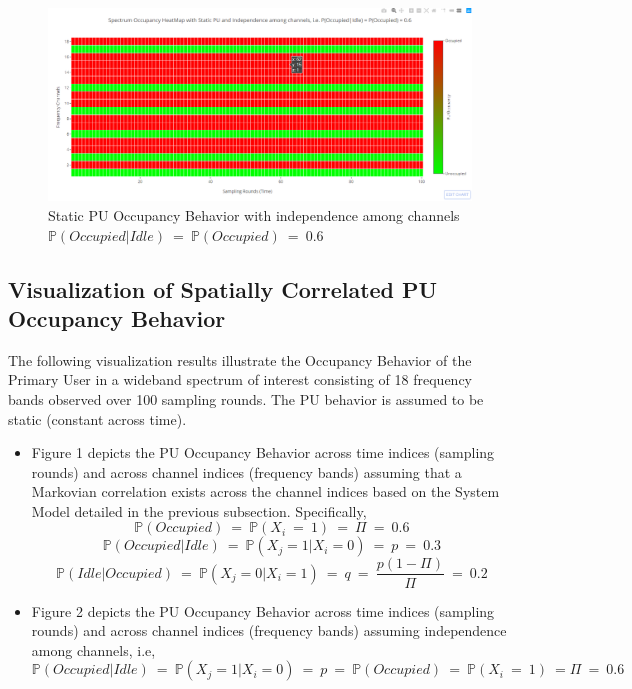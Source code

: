 \documentclass[12pt, draftcls, onecolumn]{IEEEtran}
\begin{document}
\begin{figure}[t]
\includegraphics[width=1.0\textwidth]{Spectrum_Occupancy_Spatial_Independence_2.png}
\caption{Static PU Occupancy Behavior with independence among channels $\mathbb P(Occupied|Idle)\ =\ \mathbb P(Occupied)\ =\ 0.6$}
\label{fig:mesh2}
\centering
\end{figure}
\subsection{Visualization of Spatially Correlated PU Occupancy Behavior}
The following visualization results illustrate the Occupancy Behavior of the Primary User in a wideband spectrum of interest consisting of 18 frequency bands observed over 100 sampling rounds. The PU behavior is assumed to be static (constant across time).
\newline
\begin{itemize}
    \item Figure 1 depicts the PU Occupancy Behavior across time indices (sampling rounds) and across channel indices (frequency bands) assuming that a Markovian correlation exists across the channel indices based on the System Model detailed in the previous subsection. Specifically,
    \[\mathbb P(Occupied)\ =\ \mathbb P(X_i\ =\ 1)\ =\ \Pi\ =\ 0.6\]
    \[\mathbb P(Occupied|Idle)\ =\ \mathbb P(X_j = 1|X_i = 0)\ =\ p\ =\ 0.3\]
    \[\mathbb P(Idle|Occupied)\ =\ \mathbb P(X_j = 0|X_i = 1)\ =\ q\ =\ \frac{p(1-\Pi)}{\Pi}\ =\ 0.2\]
    \item Figure 2 depicts the PU Occupancy Behavior across time indices (sampling rounds) and across channel indices (frequency bands) assuming independence among channels, i.e,
    \[\mathbb P(Occupied|Idle)\ =\ \mathbb P(X_j = 1|X_i = 0)\ =\ p\ =\ \mathbb P(Occupied)\ =\ \mathbb P(X_i\ =\ 1)\ = \Pi\ =\ 0.6\]
\end{itemize}
\end{document}
